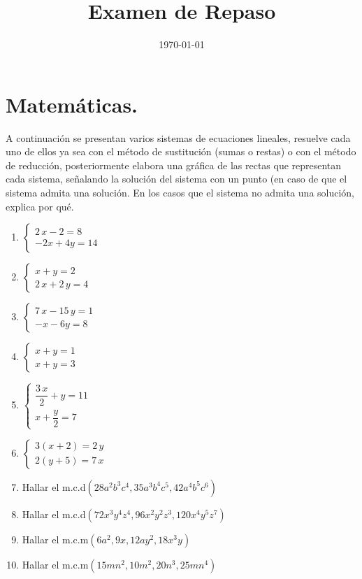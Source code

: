 \documentclass[14pt]{article}
\title{\vspace*{-2cm}Examen de Repaso\vspace{-5ex}}
\date{\today}
\begin{document}
\maketitle

\section{Matemáticas.}

A continuación se presentan varios sistemas de ecuaciones lineales, resuelve cada uno de ellos ya sea con el método de sustitución (sumas o restas) o con el método de reducción, posteriormente elabora una gráfica de las rectas que representan cada sistema, señalando la solución del sistema con un punto (en caso de que el sistema admita una solución. En los casos que el sistema no admita una solución, explica por qué.\begin{enumerate}
\item $\begin{cases}
2 \, x - 2 = 8 \\
-2 x + 4 y = 14
\end{cases}$
\item $\begin{cases}
x + y = 2 \\
2 \, x + 2 \, y =4
\end{cases}$
\item $\begin{cases}
7 \, x - 15 \, y = 1 \\
- x - 6 y = 8
\end{cases}$
\item $\begin{cases}
x + y = 1 \\
x + y = 3
\end{cases}$
\item $\begin{cases}
\dfrac{3 \, x}{2} + y = 11 \\[0.5em]
x + \dfrac{y}{2} = 7 
\end{cases}$
\item $\begin{cases}
3 (x + 2) = 2 \, y \\
2 (y + 5) = 7 \, x
\end{cases}$
\item Hallar el m.c.d$(28 a^{2} b^{3} c^{4}, 35 a^{3} b^{4} c^{5}, 42 a^{4} b^{5} c^{6})$
\item Hallar el m.c.d$(72 x^{3} y^{4} z^{4}, 96 x^{2} y^{2} z^{3}, 120 x^{4} y^{5} z^{7})$
\item Hallar el m.c.m$(6 a^{2}, 9 x, 12 a y^{2}, 18 x^{3} y)$
\item Hallar el m.c.m$(15 m n^{2}, 10 m^{2}, 20 n^{3}, 25 m n^{4})$
\end{enumerate}
\end{document}
